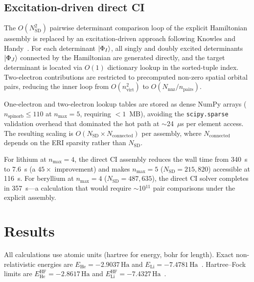 \documentclass[aps,pra,twocolumn,superscriptaddress,longbibliography,floatfix]{revtex4-2}
\begin{document}
\subsection{Excitation-driven direct CI}
\label{sec:direct_ci}

The $O(N_{\text{SD}}^2)$ pairwise determinant comparison loop of the
explicit Hamiltonian assembly is replaced by an excitation-driven
approach following Knowles and Handy~\cite{Knowles1984}.
For each determinant $\ket{\Phi_I}$, all singly and doubly excited
determinants $\ket{\Phi_J}$ connected by the Hamiltonian are generated
directly, and the target determinant is located via $O(1)$ dictionary
lookup in the sorted-tuple index.
Two-electron contributions are restricted to precomputed non-zero
spatial orbital pairs, reducing the inner loop from $O(n_{\text{virt}}^2)$
to $O(N_{\text{nnz}}/n_{\text{pairs}})$.

One-electron and two-electron lookup tables are stored as dense NumPy
arrays ($n_{\text{spinorb}} \leq 110$ at $n_{\max} = 5$, requiring
$<1$~MB), avoiding the \texttt{scipy.sparse} validation overhead that
dominated the hot path at $\sim$24~$\mu$s per element access.
The resulting scaling is
$O(N_{\text{SD}} \times N_{\text{connected}})$ per assembly,
where $N_{\text{connected}}$ depends on the ERI sparsity rather than
$N_{\text{SD}}$.

For lithium at $n_{\max}=4$, the direct CI assembly reduces the
wall time from 340~s to 7.6~s (a $45\times$ improvement) and makes
$n_{\max}=5$ ($N_{\text{SD}} = 215{,}820$) accessible at 116~s.
For beryllium at $n_{\max}=4$ ($N_{\text{SD}} = 487{,}635$), the
direct CI solver completes in 357~s---a calculation that would require
$\sim$10$^{11}$ pair comparisons under the explicit assembly.

\section{Results}
\label{sec:results}

All calculations use atomic units (hartree for energy, bohr for
length).
Exact non-relativistic energies are $E_{\text{He}} = -2.9037\,\text{Ha}$
and $E_{\text{Li}} = -7.4781\,\text{Ha}$~\cite{NIST_ASD}.
Hartree--Fock limits are $E_{\text{He}}^{\text{HF}} = -2.8617\,\text{Ha}$
and $E_{\text{Li}}^{\text{HF}} = -7.4327\,\text{Ha}$~\cite{Fischer1977}.
\end{document}
